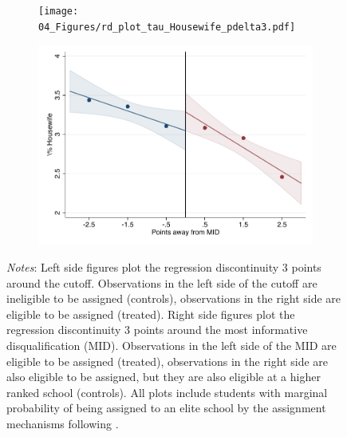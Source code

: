 \documentclass[oneside,11pt]{article}
\begin{document}
\begin{figure}[H]
\begin{center}
    \begin{subfigure}{0.475\textwidth}
        \centering
        \texttt{[image: 04\_Figures/rd\_plot\_tau\_Housewife\_pdelta3.pdf]}
    \end{subfigure}
    \begin{subfigure}{0.475\textwidth}
        \centering
        \includegraphics[width=\textwidth]{04_Figures/rd_plot_mid_Housewife_pdelta3.pdf}
    \end{subfigure}
    \end{center}
    
\footnotesize
\textit{Notes}: Left side figures plot the regression discontinuity 3 points around the cutoff. Observations in the left side of the cutoff are ineligible to be assigned (controls), observations in the right side are eligible to be assigned (treated). Right side figures plot the regression discontinuity 3 points around the most informative disqualification (MID). Observations in the left side of the MID are eligible to be assigned (treated), observations in the right side are also eligible to be assigned, but they are also eligible at a higher ranked school (controls). All plots include students with marginal probability of being assigned to an elite school by the assignment mechanisms following \citet{abdulkadirouglu2022breaking}. 
\end{figure}
\end{document}
